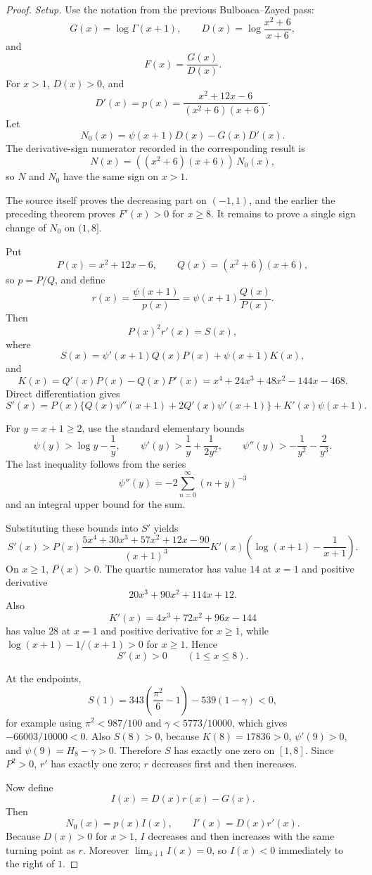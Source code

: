 \begin{proof}
\emph{Setup.}
Use the notation from the previous Bulboaca--Zayed pass:
\[
G(x)=\log\Gamma(x+1),\qquad
D(x)=\log\frac{x^2+6}{x+6},
\]
and
\[
F(x)=\frac{G(x)}{D(x)}.
\]
For \(x>1\), \(D(x)>0\), and
\[
D'(x)=p(x)=\frac{x^2+12x-6}{(x^2+6)(x+6)}.
\]
Let
\[
N_0(x)=\psi(x+1)D(x)-G(x)D'(x).
\]
The derivative-sign numerator recorded in
the corresponding result is
\[
N(x)=((x^2+6)(x+6))\,N_0(x),
\]
so \(N\) and \(N_0\) have the same sign on \(x>1\).

The source itself proves the decreasing part on \((-1,1)\), and the earlier
the preceding theorem proves \(F'(x)>0\) for
\(x\ge8\).  It remains to prove a single sign change of \(N_0\) on \((1,8]\).

Put
\[
P(x)=x^2+12x-6,\qquad Q(x)=(x^2+6)(x+6),
\]
so \(p=P/Q\), and define
\[
r(x)=\frac{\psi(x+1)}{p(x)}=\psi(x+1)\frac{Q(x)}{P(x)}.
\]
Then
\[
P(x)^2r'(x)=S(x),
\]
where
\[
S(x)=\psi'(x+1)Q(x)P(x)+\psi(x+1)K(x),
\]
and
\[
K(x)=Q'(x)P(x)-Q(x)P'(x)
=x^4+24x^3+48x^2-144x-468.
\]
Direct differentiation gives
\[
S'(x)=P(x)\{Q(x)\psi''(x+1)+2Q'(x)\psi'(x+1)\}+K'(x)\psi(x+1).
\]

For \(y=x+1\ge2\), use the standard elementary bounds
\[
\psi(y)>\log y-\frac1y,\qquad
\psi'(y)>\frac1y+\frac{1}{2y^2},\qquad
\psi''(y)>-\frac1{y^2}-\frac2{y^3}.
\]
The last inequality follows from the series
\[
\psi''(y)=-2\sum_{n=0}^{\infty}(n+y)^{-3}
\]
and an integral upper bound for the sum.

Substituting these bounds into \(S'\) yields
\[
S'(x)>
P(x)\frac{5x^4+30x^3+57x^2+12x-90}{(x+1)^3}
K'(x)\left(\log(x+1)-\frac1{x+1}\right).
\]
On \(x\ge1\), \(P(x)>0\).  The quartic numerator has value \(14\) at \(x=1\)
and positive derivative
\[
20x^3+90x^2+114x+12.
\]
Also
\[
K'(x)=4x^3+72x^2+96x-144
\]
has value \(28\) at \(x=1\) and positive derivative for \(x\ge1\), while
\(\log(x+1)-1/(x+1)>0\) for \(x\ge1\).  Hence
\[
S'(x)>0\qquad(1\le x\le8).
\]

At the endpoints,
\[
S(1)=343\left(\frac{\pi^2}{6}-1\right)-539(1-\gamma)<0,
\]
for example using \(\pi^2<987/100\) and \(\gamma<5773/10000\), which gives
\(-66003/10000<0\).  Also \(S(8)>0\), because \(K(8)=17836>0\),
\(\psi'(9)>0\), and \(\psi(9)=H_8-\gamma>0\).  Therefore \(S\) has exactly
one zero on \([1,8]\).  Since \(P^2>0\), \(r'\) has exactly one zero; \(r\)
decreases first and then increases.

Now define
\[
I(x)=D(x)r(x)-G(x).
\]
Then
\[
N_0(x)=p(x)I(x),\qquad I'(x)=D(x)r'(x).
\]
Because \(D(x)>0\) for \(x>1\), \(I\) decreases and then increases with the
same turning point as \(r\).  Moreover \(\lim_{x\downarrow1}I(x)=0\), so
\(I(x)<0\) immediately to the right of \(1\).


\end{proof}
